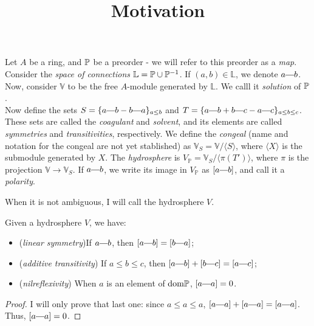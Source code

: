 


\title{Motivation}


	\maketitle
\begin{definition}
    Let $A$ be a ring, and $\mathbb{P}$ be a preorder - we will refer to this preorder
    as a \textit{map}. 
    Consider the \textit{space of connections} $\mathbb{L} = \mathbb{P} \cup \mathbb{P}^{-1}$.
    If $(a, b) \in \mathbb{L}$, we denote $a \connect b$.
    Now, consider $\mathbb{V}$ to be the free $A$-module generated by $\mathbb{L}$.
    We calll it \textit{solution} of $\mathbb{P}$.\\
    Now define the sets $S = \{ a \connect b - b \connect a\}_{a \leq b}$ and $T = \{ a \connect b + b \connect c - a \connect c\}_{a \leq b \leq c}$. These sets are called the \textit{coagulant} and \textit{solvent}, and its elements are called \textit{symmetries} and \textit{transitivities}, respectively. We define the \textit{congeal} (name and notation for the congeal are not yet stablished) as $\mathbb{V}_S = \mathbb{V} / \langle S \rangle$, where $\langle X \rangle$ is the submodule generated by $X$. The \textit{hydrosphere} is $V_\mathbb{P} = \mathbb{V}_S/\langle \pi(T') \rangle$, where $\pi$ is the projection $\mathbb{V} \to \mathbb{V}_S$. If $a \connect b$, we write its image in $V_\mathbb{P}$ as $[a \connect b]$, and call it a \textit{polarity}.
\end{definition}
\par When it is not ambiguous, I will call the hydrosphere $V$.
\begin{prop}
	Given a hydrosphere $V$, we have:
	\begin{itemize}
		\item (\textit{linear symmetry})If $a \connect b$, then $[a \connect b] = [b \connect a]$;
		\item (\textit{additive transitivity}) If $a \leq b \leq c$, then $[a \connect b] + [b \connect c] = [a \connect c]$;
		\item(\textit{nilreflexivity}) When $a$ is an element of $\text{dom} \mathbb{P}$, $[a \connect a] = 0$.
	\end{itemize}
\end{prop}
\begin{proof}
	I will only prove that last one: since $a \leq a \leq a$, $[a \connect a] + [a \connect a] = [a \connect a]$. Thus, $[a \connect a] = 0$.
\end{proof}
